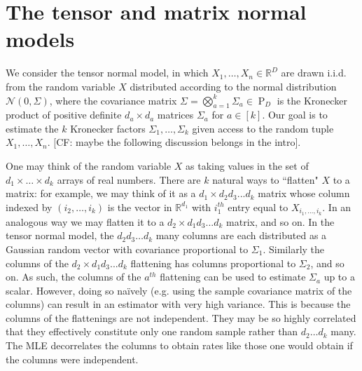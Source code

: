 \documentclass{article}
\newcommand{\R}{{\mathbb{R}}}
\newcommand\cN{\mathcal{N}}
\newcommand\PD{\operatorname{P}}
\newcommand{\CF}[1]{{\color{purple}[CF: #1]}}
\begin{document}

\section{The tensor and matrix normal models}


We consider the tensor normal model, in which $X_1, \dots, X_n \in \R^D$ are drawn i.i.d. from the random variable $X$ distributed according to the normal distribution $\cN(0, \Sigma)$, where the covariance matrix $\Sigma = \bigotimes_{a = 1}^{k} \Sigma_a \in \PD_D$ is the Kronecker product of positive definite $d_a\times d_a$ matrices $\Sigma_a$ for $a\in [k]$. Our goal is to estimate the $k$ Kronecker factors $\Sigma_1, \dots, \Sigma_k$ given access to the random tuple $X_1, \dots, X_n$. \CF{maybe the following discussion belongs in the intro}. 

One may think of the random variable $X$ as taking values in the set of $d_1 \times \dots \times d_k$ arrays of real numbers. There are $k$ natural ways to ``flatten" $X$ to a matrix: for example, we may think of it as a $d_1 \times d_2d_3...d_k$ matrix whose column indexed by $(i_2,\dots, i_k)$ is the vector in $\R^{d_1}$ with $i_1^{th}$ entry equal to $X_{i_1, \dots, i_k}$. In an analogous way we may flatten it to a $d_2 \times d_1d_3...d_k$ matrix, and so on. In the tensor normal model, the $d_2d_3\dots d_k$ many columns are each distributed as a Gaussian random vector with covariance proportional to $\Sigma_1$. Similarly the columns of the $d_2 \times d_1d_3...d_k$ flattening has columns proportional to $\Sigma_2$, and so on. As such, the columns of the $a^{th}$ flattening can be used to estimate $\Sigma_a$ up to a scalar. However, doing so na\"ively (e.g. using the sample covariance matrix of the columns) can result in an estimator with very high variance. This is because the columns of the flattenings are not independent. They may be so highly correlated that they effectively constitute only one random sample rather than $d_2\dots d_k$ many. The MLE decorrelates the columns to obtain rates like those one would obtain if the columns were independent.
\end{document}
